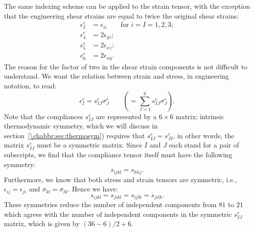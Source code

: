 The same indexing scheme can be applied to the strain tensor, with the exception that the engineering shear strains are equal to twice the original shear strains: 
\begin{subequations}
\begin{align}
	\epsilon^e_I&= \epsilon_{ii}\qquad\mbox{for $i=I=1,2,3$};\nonumber\\
	\epsilon^e_4 &= 2\epsilon_{yz};\\
	\epsilon^e_5 &= 2\epsilon_{xz};\\
	\epsilon^e_6 &= 2\epsilon_{xy}.
\end{align}
\end{subequations}
The reason for the factor of two in the shear strain components is not difficult to understand.  We want the relation between strain and stress, in engineering notation, to read:
\begin{equation}
	\epsilon^e_I= s^e_{IJ} \sigma^e_J \qquad\left(= \sum_{J=1}^6 s^e_{IJ} \sigma^e_J\right).\label{\chabbr:eq:seIJ}
\end{equation}
Note that the compliances $s^e_{IJ}$ are represented by a $6\times 6$ matrix; intrinsic thermodynamic symmetry, which we will discuss in section~\ref{\chabbr:sec:thermosym}) requires that $s^e_{IJ}=s^e_{JI}$, in other words, the matrix $s^e_{IJ}$ must be a symmetric matrix.  Since $I$ and $J$ each stand for a pair of subscripts, we find that the compliance tensor itself must have the following symmetry:
\begin{equation}
	s_{ijkl} = s_{klij}.
\end{equation}
Furthermore, we know that both stress and strain tensors are symmetric, i.e., $\epsilon_{ij}=\epsilon_{ji}$ and $\sigma_{kl} = \sigma_{lk}$.  Hence we have:
\[
	s_{ijkl} = s_{jikl} = s_{ijlk} = s_{jilk}.
\]
These symmetries reduce the number of independent components from $81$ to $21$ which agrees with the number of independent components in the symmetric $s^e_{IJ}$ matrix, which is given by $(36-6)/2+6$.  

